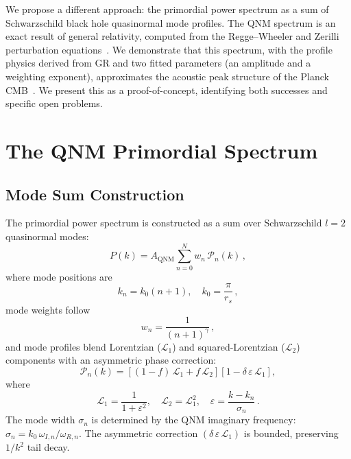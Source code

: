 \documentclass[aps,prd,twocolumn,superscriptaddress,showpacs,preprintnumbers,amsmath,amssymb,nofootinbib]{revtex4-2}
\begin{document}
We propose a different approach: the primordial power spectrum as a sum of Schwarzschild black hole quasinormal mode profiles. The QNM spectrum is an exact result of general relativity, computed from the Regge--Wheeler and Zerilli perturbation equations~\cite{ReggeWheeler1957,Zerilli1970,Leaver1985}. We demonstrate that this spectrum, with the profile physics derived from GR and two fitted parameters (an amplitude and a weighting exponent), approximates the acoustic peak structure of the Planck CMB~\cite{Planck2020}. We present this as a proof-of-concept, identifying both successes and specific open problems.


\section{The QNM Primordial Spectrum}
\label{sec:spectrum}

\subsection{Mode Sum Construction}
\label{sec:modesum}

The primordial power spectrum is constructed as a sum over Schwarzschild $l = 2$ quasinormal modes:
\begin{equation}
\label{eq:pk_qnm}
P(k) = A_\mathrm{QNM} \sum_{n=0}^{N} w_n \, \mathcal{P}_n(k)\,,
\end{equation}
where mode positions are
\begin{equation}
\label{eq:kn}
k_n = k_0 (n + 1), \quad k_0 = \frac{\pi}{r_s}\,,
\end{equation}
mode weights follow
\begin{equation}
\label{eq:wn}
w_n = \frac{1}{(n+1)^\gamma}\,,
\end{equation}
and mode profiles blend Lorentzian ($\mathcal{L}_1$) and squared-Lorentzian ($\mathcal{L}_2$) components with an asymmetric phase correction:
\begin{equation}
\label{eq:profile}
\mathcal{P}_n(k) = \left[(1 - f)\,\mathcal{L}_1 + f\,\mathcal{L}_2\right] \left[1 - \delta\,\varepsilon\,\mathcal{L}_1\right],
\end{equation}
where
\begin{equation}
\label{eq:lorentzians}
\mathcal{L}_1 = \frac{1}{1 + \varepsilon^2}, \quad \mathcal{L}_2 = \mathcal{L}_1^2, \quad \varepsilon = \frac{k - k_n}{\sigma_n}\,.
\end{equation}
The mode width $\sigma_n$ is determined by the QNM imaginary frequency: $\sigma_n = k_0\,\omega_{I,n}/\omega_{R,n}$. The asymmetric correction $(\delta\,\varepsilon\,\mathcal{L}_1)$ is bounded, preserving $1/k^2$ tail decay.
\end{document}
